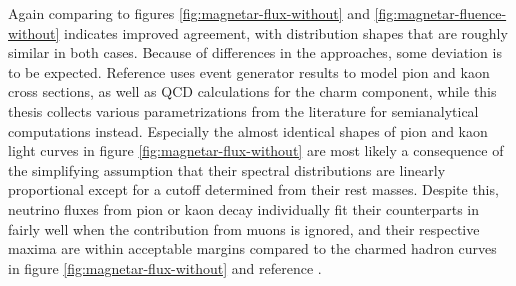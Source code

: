 Again comparing \cite{Carpio_2020} to figures \ref{fig:magnetar-flux-without} and \ref{fig:magnetar-fluence-without} indicates improved
agreement, with distribution shapes that are roughly similar in both cases. Because of differences in the approaches, some deviation is
to be expected. Reference \cite{Carpio_2020} uses event generator results to model pion and kaon cross sections, as well as QCD calculations
for the charm component, while this thesis collects various parametrizations from the literature for semianalytical computations instead.
Especially the almost identical shapes of pion and kaon light curves in figure \ref{fig:magnetar-flux-without} are most likely a consequence
of the simplifying assumption that their spectral distributions are linearly proportional except for a cutoff determined from their rest
masses. Despite this, neutrino fluxes from pion or kaon decay individually fit their counterparts in \cite{Carpio_2020} fairly well when
the contribution from muons is ignored, and their respective maxima are within acceptable margins compared to the charmed hadron curves in
figure \ref{fig:magnetar-flux-without} and reference \cite{Carpio_2020}.

